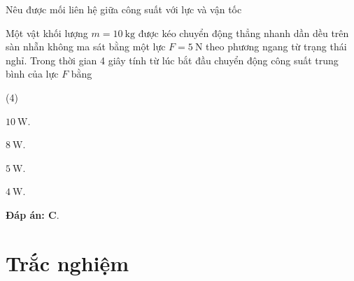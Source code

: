 \begin{dang}{Nêu được mối liên hệ giữa công suất với lực và vận tốc}
{		Một vật khối lượng $m=\SI{10}{\kilogram}$ được kéo chuyển động thẳng nhanh dần dều trên sàn nhẵn không ma sát bằng một lực $F=\SI{5}{\newton}$ theo phương ngang từ trạng thái nghỉ. Trong thời gian 4 giây tính từ lúc bắt đầu chuyển động công suất trung bình của lực $F$ bằng
		\begin{mcq}(4)
			\item $\SI{10}{\watt}$.
			\item $\SI{8}{\watt}$.
			\item $\SI{5}{\watt}$.
			\item $\SI{4}{\watt}$.
		\end{mcq}
		
		\textbf{Đáp án: C}.
	}
\end{dang}


\section{Trắc nghiệm}
